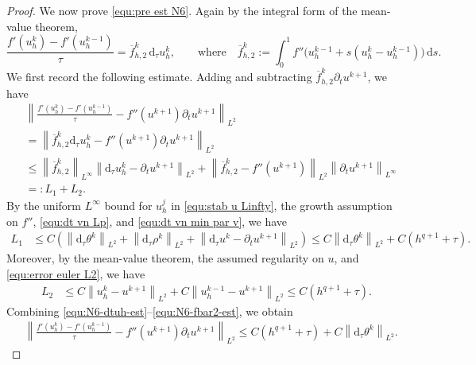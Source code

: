 \documentclass[11pt, reqno]{amsart}
\theoremstyle{definition}
\numberwithin{equation}{section}
\newcommand{\dtt}{\mathrm{d}_\tau}
\newcommand{\ds}{\mathrm{d}s}
\newcommand{\norm}[2]{\left\|{#1}\right\|_{#2}}
\begin{document}
\begin{proof}
	We now prove \eqref{equ:pre est N6}. Again by the integral form of the mean-value theorem,
	\[
	\frac{f'(u_h^k)-f'(u_h^{k-1})}{\tau}
	=
	\overline f_{h,2}^k\, \dtt u_h^k, \qquad \text{where} \quad 
	\overline f_{h,2}^k
	:=
	\int_0^1
	f''\big(u_h^{k-1}+s(u_h^k-u_h^{k-1})\big)\,\ds .
	\]
	We first record the following estimate.
	Adding and subtracting
	$\overline f_{h,2}^k\partial_tu^{k+1}$, we have
	\begin{align*}
		&\norm{
			\frac{f'(u_h^k)-f'(u_h^{k-1})}{\tau}
			-
			f''(u^{k+1})\partial_tu^{k+1}
		}{L^2}
		\nonumber\\
		&=
		\norm{
			\overline f_{h,2}^k \dtt u_h^k
			-
			f''(u^{k+1})\partial_tu^{k+1}
		}{L^2}
		\nonumber\\
		&
		\leq
		\norm{\overline f_{h,2}^k}{L^\infty}
		\norm{\dtt u_h^k-\partial_tu^{k+1}}{L^2}
		+
		\norm{\overline f_{h,2}^k-f''(u^{k+1})}{L^2}
		\norm{\partial_tu^{k+1}}{L^\infty}
		\nonumber\\
		&=: L_1+L_2.
	\end{align*}
	By the uniform $L^\infty$ bound for $u_h^j$ in \eqref{equ:stab u Linfty}, the growth assumption on $f''$, \eqref{equ:dt vn Lp}, and \eqref{equ:dt vn min par v}, we have
	\begin{align}
		L_1
		&\leq
		C\left(\norm{\dtt\theta^k}{L^2}
		+
		\norm{\dtt\rho^k}{L^2}
		+
		\norm{\dtt u^k-\partial_tu^{k+1}}{L^2}\right)
		\leq
		C\norm{\dtt\theta^k}{L^2}
		+
		C(h^{q+1}+\tau).
		\label{equ:N6-dtuh-est}
	\end{align}
	Moreover, by the mean-value theorem, the assumed regularity on $u$, and \eqref{equ:error euler L2}, we have
	\begin{align}
		L_2
		&\leq
		C\norm{u_h^k-u^{k+1}}{L^2}
		+
		C\norm{u_h^{k-1}-u^{k+1}}{L^2}
		\leq
		C(h^{q+1}+\tau).
		\label{equ:N6-fbar2-est}
	\end{align}
	Combining \eqref{equ:N6-dtuh-est}--\eqref{equ:N6-fbar2-est}, we obtain
	\begin{align}
		\label{equ:diff-fprime-est}
		&\norm{
			\frac{f'(u_h^k)-f'(u_h^{k-1})}{\tau}
			-
			f''(u^{k+1})\partial_tu^{k+1}
		}{L^2}
		\leq
		C(h^{q+1}+\tau)
		+
		C\norm{\dtt\theta^k}{L^2}.
	\end{align}
	

\end{proof}
\end{document}
